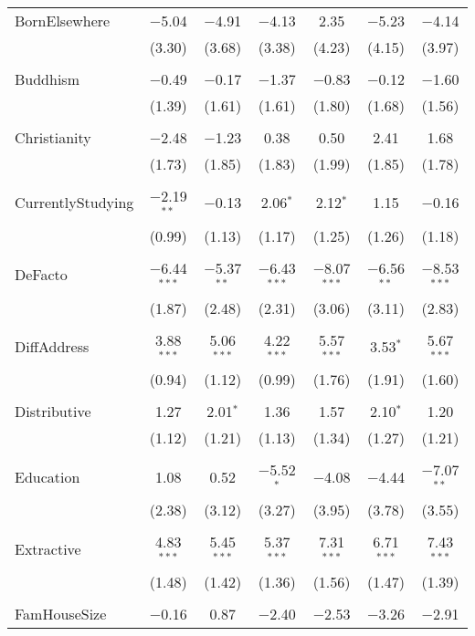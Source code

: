 \documentclass[openany]{book}
\begin{document}
\begin{table}[!htbp]
\begin{tabular}{@{\extracolsep{1pt}}lcccccc}
 BornElsewhere & $-$5.04 & $-$4.91 & $-$4.13 & 2.35 & $-$5.23 & $-$4.14 \\ 
  & (3.30) & (3.68) & (3.38) & (4.23) & (4.15) & (3.97) \\ 
  & & & & & & \\ 
 Buddhism & $-$0.49 & $-$0.17 & $-$1.37 & $-$0.83 & $-$0.12 & $-$1.60 \\ 
  & (1.39) & (1.61) & (1.61) & (1.80) & (1.68) & (1.56) \\ 
  & & & & & & \\ 
 Christianity & $-$2.48 & $-$1.23 & 0.38 & 0.50 & 2.41 & 1.68 \\ 
  & (1.73) & (1.85) & (1.83) & (1.99) & (1.85) & (1.78) \\ 
  & & & & & & \\ 
 CurrentlyStudying & $-$2.19$^{**}$ & $-$0.13 & 2.06$^{*}$ & 2.12$^{*}$ & 1.15 & $-$0.16 \\ 
  & (0.99) & (1.13) & (1.17) & (1.25) & (1.26) & (1.18) \\ 
  & & & & & & \\ 
 DeFacto & $-$6.44$^{***}$ & $-$5.37$^{**}$ & $-$6.43$^{***}$ & $-$8.07$^{***}$ & $-$6.56$^{**}$ & $-$8.53$^{***}$ \\ 
  & (1.87) & (2.48) & (2.31) & (3.06) & (3.11) & (2.83) \\ 
  & & & & & & \\ 
 DiffAddress & 3.88$^{***}$ & 5.06$^{***}$ & 4.22$^{***}$ & 5.57$^{***}$ & 3.53$^{*}$ & 5.67$^{***}$ \\ 
  & (0.94) & (1.12) & (0.99) & (1.76) & (1.91) & (1.60) \\ 
  & & & & & & \\ 
 Distributive & 1.27 & 2.01$^{*}$ & 1.36 & 1.57 & 2.10$^{*}$ & 1.20 \\ 
  & (1.12) & (1.21) & (1.13) & (1.34) & (1.27) & (1.21) \\ 
  & & & & & & \\ 
 Education & 1.08 & 0.52 & $-$5.52$^{*}$ & $-$4.08 & $-$4.44 & $-$7.07$^{**}$ \\ 
  & (2.38) & (3.12) & (3.27) & (3.95) & (3.78) & (3.55) \\ 
  & & & & & & \\ 
 Extractive & 4.83$^{***}$ & 5.45$^{***}$ & 5.37$^{***}$ & 7.31$^{***}$ & 6.71$^{***}$ & 7.43$^{***}$ \\ 
  & (1.48) & (1.42) & (1.36) & (1.56) & (1.47) & (1.39) \\ 
  & & & & & & \\ 
 FamHouseSize & $-$0.16 & 0.87 & $-$2.40 & $-$2.53 & $-$3.26 & $-$2.91 \\ 

\end{tabular}
\end{table}
\end{document}
